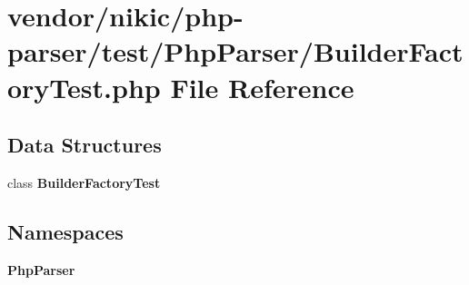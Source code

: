 \section{vendor/nikic/php-\/parser/test/\+Php\+Parser/\+Builder\+Factory\+Test.php File Reference}
\label{_builder_factory_test_8php}
\subsection*{Data Structures}
\begin{DoxyCompactItemize}
\item 
class {\bf Builder\+Factory\+Test}
\end{DoxyCompactItemize}
\subsection*{Namespaces}
\begin{DoxyCompactItemize}
\item 
 {\bf Php\+Parser}
\end{DoxyCompactItemize}

